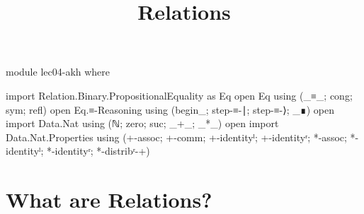 \documentclass{lecturenotes}
\title{Relations}
\begin{document}
\maketitle

\begin{code}
module lec04-akh where

import Relation.Binary.PropositionalEquality as Eq
open Eq using (_≡_; cong; sym; refl)
open Eq.≡-Reasoning using (begin_; step-≡-∣; step-≡-⟩; _∎)
open import Data.Nat using (ℕ; zero; suc; _+_; _*_)
open import Data.Nat.Properties using
  (+-assoc; +-comm; +-identityˡ; +-identityʳ; *-assoc; *-identityˡ; *-identityʳ; *-distribʳ-+)
\end{code}

\section{What are Relations?}
\label{sec:what-are-relations}
\end{document}
